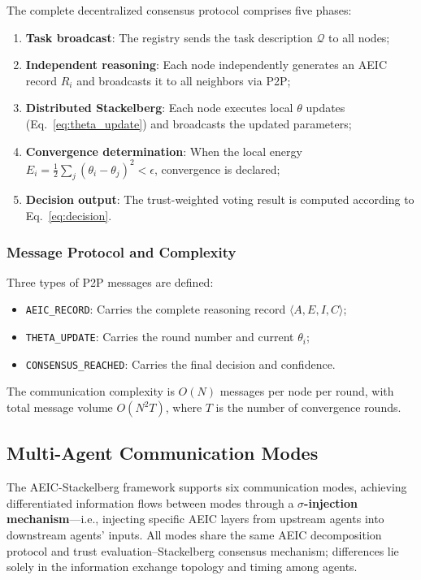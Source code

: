 \documentclass[12pt,a4paper]{article}
\begin{document}
The complete decentralized consensus protocol comprises five phases:
\begin{enumerate}[nosep]
    \item \textbf{Task broadcast}: The registry sends the task description $\mathcal{Q}$ to all nodes;
    \item \textbf{Independent reasoning}: Each node independently generates an AEIC record $R_i$ and broadcasts it to all neighbors via P2P;
    \item \textbf{Distributed Stackelberg}: Each node executes local $\theta$ updates (Eq.~\eqref{eq:theta_update}) and broadcasts the updated parameters;
    \item \textbf{Convergence determination}: When the local energy $E_i = \frac{1}{2}\sum_j (\theta_i - \theta_j)^2 < \epsilon$, convergence is declared;
    \item \textbf{Decision output}: The trust-weighted voting result is computed according to Eq.~\eqref{eq:decision}.
\end{enumerate}

\subsubsection{Message Protocol and Complexity}

Three types of P2P messages are defined:
\begin{itemize}[nosep]
    \item \texttt{AEIC\_RECORD}: Carries the complete reasoning record $\langle A, E, I, C \rangle$;
    \item \texttt{THETA\_UPDATE}: Carries the round number and current $\theta_i$;
    \item \texttt{CONSENSUS\_REACHED}: Carries the final decision and confidence.
\end{itemize}

The communication complexity is $O(N)$ messages per node per round, with total message volume $O(N^2 T)$, where $T$ is the number of convergence rounds.

\subsection{Multi-Agent Communication Modes}\label{sec:modes}

The AEIC-Stackelberg framework supports six communication modes, achieving differentiated information flows between modes through a \textbf{$\sigma$-injection mechanism}---i.e., injecting specific AEIC layers from upstream agents into downstream agents' inputs. All modes share the same AEIC decomposition protocol and trust evaluation--Stackelberg consensus mechanism; differences lie solely in the information exchange topology and timing among agents.
\end{document}
